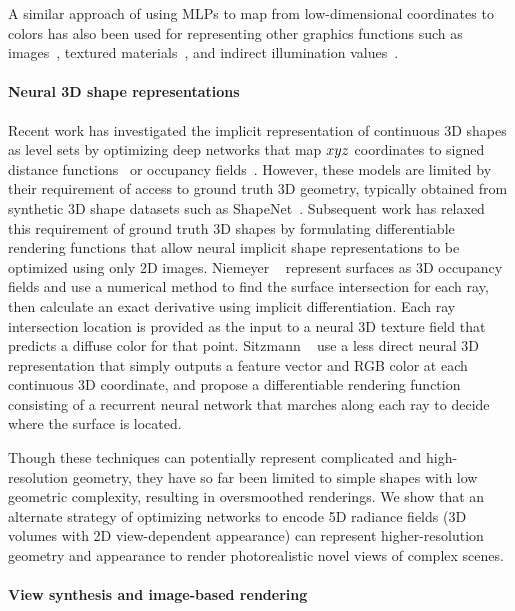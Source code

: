 \documentclass[runningheads]{llncs}
\begin{document}
A similar approach of using MLPs to map from low-dimensional coordinates to colors has also been used for representing other graphics functions such as images~\cite{stanley2007compositional}, textured materials~\cite{henzler20,texturefields,rainer20,rainer19}, and indirect illumination values~\cite{rrf}.

\paragraph{\textbf{Neural 3D shape representations}}

Recent work has investigated the implicit representation of continuous 3D shapes as level sets by optimizing deep networks that map $xyz$ coordinates to signed distance functions~\cite{jiang2020,deepsdf} or occupancy fields~\cite{genova2020,occupancynet}. However, these models are limited by their requirement of access to ground truth 3D geometry, typically obtained from synthetic 3D shape datasets such as ShapeNet~\cite{shapenet}. 
Subsequent work has relaxed this requirement of ground truth 3D shapes by formulating differentiable rendering functions that allow neural implicit shape representations to be optimized using only 2D images. Niemeyer \etal~\cite{diffvolumetric} represent surfaces as 3D occupancy fields and use a numerical method to find the surface intersection for each ray, then calculate an exact derivative using implicit differentiation. Each ray intersection location is provided as the input to a neural 3D texture field that predicts a diffuse color for that point. Sitzmann \etal~\cite{srn} use a less direct neural 3D representation that simply outputs a feature vector and RGB color at each continuous 3D coordinate, and propose a differentiable rendering function consisting of a recurrent neural network that marches along each ray to decide where the surface is located.

Though these techniques can potentially represent complicated and high-resolution geometry, they have so far been limited to simple shapes with low geometric complexity, resulting in oversmoothed renderings. We show that an alternate strategy of optimizing networks to encode 5D radiance fields (3D volumes with 2D view-dependent appearance) can represent higher-resolution geometry and appearance to render photorealistic novel views of complex scenes.

\paragraph{\textbf{View synthesis and image-based rendering}}
\end{document}
